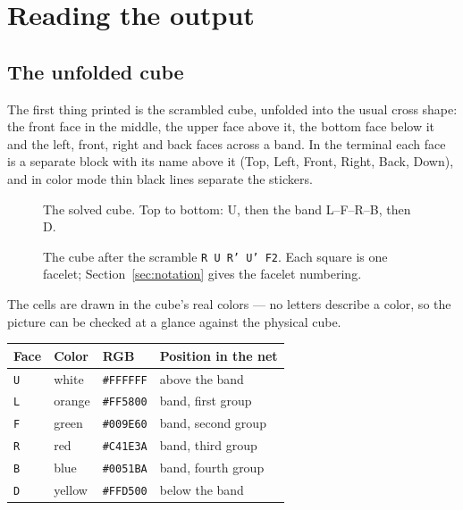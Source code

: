 \section{Reading the output}
\label{sec:output}

\subsection{The unfolded cube}

The first thing printed is the scrambled cube, unfolded into the usual cross shape:
the front face in the middle, the upper face above it, the bottom face below it and
the left, front, right and back faces across a band.  In the terminal each face is a separate
block with its name above it (Top, Left, Front, Right, Back, Down), and in color
mode thin black lines separate the stickers.

\begin{figure}[htbp]
\centering
{}
\caption{The solved cube.  Top to bottom: U, then the band L--F--R--B, then D.}
\label{fig:net-solved}
\end{figure}

\begin{figure}[htbp]
\centering
{}
\caption{The cube after the scramble \texttt{R U R' U' F2}.  Each square is one
facelet; Section~\ref{sec:notation} gives the facelet numbering.}
\label{fig:net-scrambled}
\end{figure}

The cells are drawn in the cube's real colors --- no letters describe a color, so
the picture can be checked at a glance against the physical cube.

\begin{center}
\begin{tabular}{@{}llll@{}}
\toprule
Face & Color & RGB & Position in the net \\
\midrule
\texttt{U} & white  & \texttt{\#FFFFFF} & above the band \\
\texttt{L} & orange & \texttt{\#FF5800} & band, first group \\
\texttt{F} & green  & \texttt{\#009E60} & band, second group \\
\texttt{R} & red    & \texttt{\#C41E3A} & band, third group \\
\texttt{B} & blue   & \texttt{\#0051BA} & band, fourth group \\
\texttt{D} & yellow & \texttt{\#FFD500} & below the band \\
\bottomrule
\end{tabular}
\end{center}

